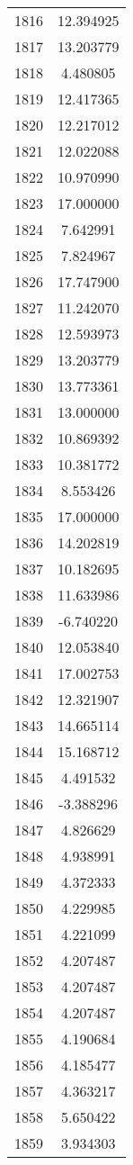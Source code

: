 \documentclass[12pt]{article}
\begin{document}
\begin{longtable}{@{}cc@{}}
1816 & 12.394925 \\
1817 & 13.203779 \\
1818 & 4.480805 \\
1819 & 12.417365 \\
1820 & 12.217012 \\
1821 & 12.022088 \\
1822 & 10.970990 \\
1823 & 17.000000 \\
1824 & 7.642991 \\
1825 & 7.824967 \\
1826 & 17.747900 \\
1827 & 11.242070 \\
1828 & 12.593973 \\
1829 & 13.203779 \\
1830 & 13.773361 \\
1831 & 13.000000 \\
1832 & 10.869392 \\
1833 & 10.381772 \\
1834 & 8.553426 \\
1835 & 17.000000 \\
1836 & 14.202819 \\
1837 & 10.182695 \\
1838 & 11.633986 \\
1839 & -6.740220 \\
1840 & 12.053840 \\
1841 & 17.002753 \\
1842 & 12.321907 \\
1843 & 14.665114 \\
1844 & 15.168712 \\
1845 & 4.491532 \\
1846 & -3.388296 \\
1847 & 4.826629 \\
1848 & 4.938991 \\
1849 & 4.372333 \\
1850 & 4.229985 \\
1851 & 4.221099 \\
1852 & 4.207487 \\
1853 & 4.207487 \\
1854 & 4.207487 \\
1855 & 4.190684 \\
1856 & 4.185477 \\
1857 & 4.363217 \\
1858 & 5.650422 \\
1859 & 3.934303 \\

\end{longtable}
\end{document}
